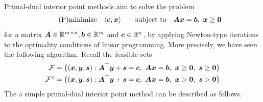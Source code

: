Primal-dual interior point methods aim to solve the problem
\begin{equation}\label{eq:standard}\tag{P}
 \minimize \ip{\vct{c}}{\vct{x}} \quad \subjto \mtx{A}\vct{x}=\vct{b}, \ \vct{x}\geq \zerovct
\end{equation}
for a matrix $\bm{A}\in \mathbb{R}^{m\times n}, \bm{b}\in \mathbb{R}^m$ and $\bm{c}\in \mathbb{R}^n$, by applying Newton-type iterations to the optimality conditions of linear programming. More precisely, we have seen the following algorithm. Recall the feasible sets
\begin{align*}
 \mathcal{F} &= \{(\vct{x},\vct{y},\vct{s}) \mid \mtx{A}^{\trans}\vct{y}+\vct{s}=\vct{c}, \ \mtx{A}\vct{x}=\vct{b}, \ \vct{x}\geq \zerovct, \ \vct{s}\geq \zerovct\}\\
 \mathcal{F}^{\circ} &= \{(\vct{x},\vct{y},\vct{s}) \mid \mtx{A}^{\trans}\vct{y}+\vct{s}=\vct{c}, \ \mtx{A}\vct{x}=\vct{b}, \ \vct{x}> \zerovct, \ \vct{s}> \zerovct\}\\
\end{align*}
The a simple primal-dual interior point method can be described as follows.
